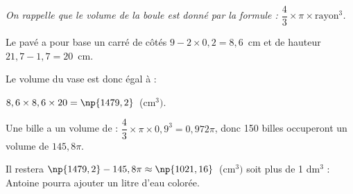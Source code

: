 
\medskip 

%
%
%

\smallskip

\emph{On rappelle que le volume de la boule est donné par la formule : $\dfrac{4}{3}\times \pi \times \text{rayon}^3$.} 

Le pavé a pour base un carré de côtés $9 - 2\times 0,2 = 8,6$~cm et de hauteur $21,7 - 1,7 = 20$~cm.

Le volume du vase est donc égal à :

$8,6 \times 8,6 \times 20 = \np{1479,2}$~(cm$^3)$.

Une bille a un volume de : $\dfrac{4}{3}\times \pi \times 0,9^3 = 0,972\pi$, donc 150 billes occuperont un volume de $145,8\pi$.

Il restera  $\np{1479,2} - 145,8\pi \approx \np{1021,16}$~(cm$^3)$ soit plus de 1 dm$^3$ : Antoine pourra ajouter un litre d'eau colorée.
